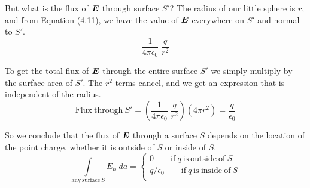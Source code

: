 But what is the flux of $\boldsymbol{E}$ through surface $S'$?
The radius of our little sphere is $r$, and from Equation (4.11),
we have the value of $\boldsymbol{E}$ everywhere on $S'$ and normal to $S'$.
\begin{equation*}
  \frac{1}{4\pi\epsilon_0} \; \frac{q}{r^2}
\end{equation*}

To get the total flux of $\boldsymbol{E}$ through the entire surface $S'$
we simply multiply by the surface area of $S'$.
The $r^2$ terms cancel, and we get an expression that is independent of the radius.
\begin{equation}
  \mathrm{Flux\ through\ } S' =
  \left( \frac{1}{4\pi\epsilon_0} \; \frac{q}{r^2} \right)
  \left( 4 \pi r^2 \right) = \frac{q}{\epsilon_0}
\end{equation}

So we conclude that the flux of $\boldsymbol{E}$ through a surface $S$
depends on the location of the point charge, 
whether it is outside of $S$ or inside of $S$.
\begin{equation}
  \int\limits_{\mathrm{any\ surface\ }S} E_n \; da = 
  \left\{ \begin{array}{c}
    0 \qquad \mathrm{if\ } q \mathrm{\ is\ outside\ of\ } S \\
    q/\epsilon_0 \qquad \mathrm{if\ } q \mathrm{\ is\ inside\ of\ } S \\
  \end{array} \right.
\end{equation}

